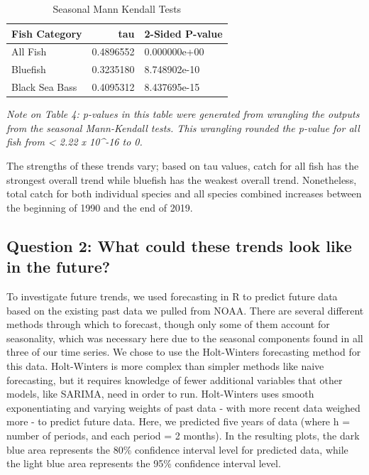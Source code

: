 \documentclass[
  12pt,
]{article}
\begin{document}
\begin{table}[H]

\caption{\label{tab:table4}Seasonal Mann Kendall Tests}
\centering
\begin{tabular}[t]{l|r|l}
\hline
Fish Category & tau & 2-Sided P-value\\
\hline
All Fish & 0.4896552 & 0.000000e+00\\
\hline
Bluefish & 0.3235180 & 8.748902e-10\\
\hline
Black Sea Bass & 0.4095312 & 8.437695e-15\\
\hline
\end{tabular}
\end{table}

\emph{Note on Table 4: p-values in this table were generated from
wrangling the outputs from the seasonal Mann-Kendall tests. This
wrangling rounded the p-value for all fish from \textless{} 2.22 x
10\^{}-16 to 0.}

The strengths of these trends vary; based on tau values, catch for all
fish has the strongest overall trend while bluefish has the weakest
overall trend. Nonetheless, total catch for both individual species and
all species combined increases between the beginning of 1990 and the end
of 2019.

\hypertarget{question-2-what-could-these-trends-look-like-in-the-future}{%
\subsection{Question 2: What could these trends look like in the
future?}\label{question-2-what-could-these-trends-look-like-in-the-future}}

To investigate future trends, we used forecasting in R to predict future
data based on the existing past data we pulled from NOAA. There are
several different methods through which to forecast, though only some of
them account for seasonality, which was necessary here due to the
seasonal components found in all three of our time series. We chose to
use the Holt-Winters forecasting method for this data. Holt-Winters is
more complex than simpler methods like naive forecasting, but it
requires knowledge of fewer additional variables that other models, like
SARIMA, need in order to run. Holt-Winters uses smooth exponentiating
and varying weights of past data - with more recent data weighed more -
to predict future data. Here, we predicted five years of data (where h =
number of periods, and each period = 2 months). In the resulting plots,
the dark blue area represents the 80\% confidence interval level for
predicted data, while the light blue area represents the 95\% confidence
interval level.
\end{document}
